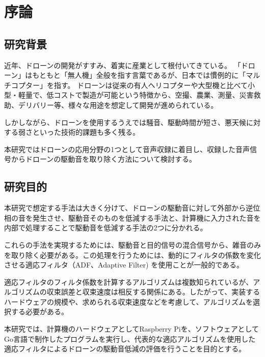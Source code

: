 \chapter{序論}\label{introduction}

\section{研究背景}\label{research-background}

近年、ドローンの開発がすすみ、着実に産業として根付いてきている。
「ドローン」はもともと「無人機」全般を指す言葉であるが、日本では慣例的に「マルチコプター」を指す。
ドローンは従来の有人ヘリコプターや大型機と比べて小型・軽量で、低コストで製造が可能という特徴から、空撮、農業、測量、災害救助、デリバリー等、様々な用途を想定して開発が進められている。

しかしながら、ドローンを使用するうえでは騒音、駆動時間が短さ、悪天候に対する弱さといった技術的課題も多く残る。

本研究ではドローンの応用分野の1つとして音声収録に着目し、収録した音声信号からドローンの駆動音を取り除く方法について検討する。

\newpage

\section{研究目的}\label{ux7814ux7a76ux76eeux7684}

本研究で想定する手法は大きく分けて、ドローンの駆動音に対して外部から逆位相の音を発生させ、駆動音そのものを低減する手法と、計算機に入力された音を内部で処理することで駆動音を低減する手法の2つに分かれる。

これらの手法を実現するためには、駆動音と目的信号の混合信号から、雑音のみを取り除く必要がある。この処理を行うためには、動的にフィルタの係数を変化させる適応フィルタ（ADF、Adaptive
Filter) を使用ことが一般的である。

適応フィルタのフィルタ係数を計算するアルゴリズムは複数知られているが、アルゴリズムの収束誤差と収束速度は相反する関係にある。したがって、実装するハードウェアの規模や、求められる収束速度などを考慮して、アルゴリズムを選択する必要がある。

本研究では、計算機のハードウェアとしてRaspberry
Piを、ソフトウェアとしてGo言語で制作したプログラムを実行し、代表的な適応アルゴリズムを使用した適応フィルタによるドローンの駆動音低減の評価を行うことを目的とする。
